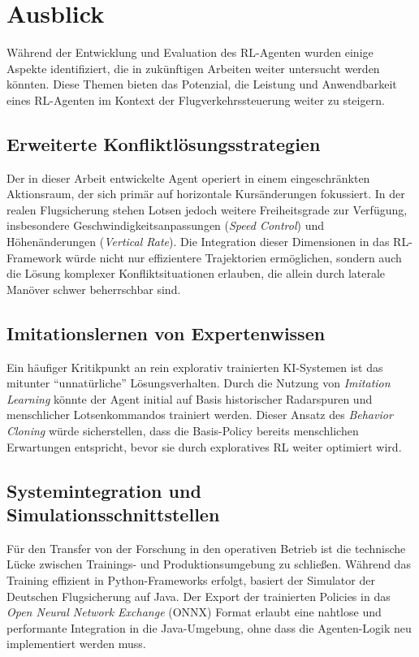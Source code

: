 \section{Ausblick}
\label{ch:Future_Work}
Während der Entwicklung und Evaluation des \ac{RL}\hyp{}Agenten wurden einige Aspekte identifiziert, die in zukünftigen Arbeiten weiter untersucht werden könnten. Diese Themen bieten das Potenzial, die Leistung und Anwendbarkeit eines \ac{RL}\hyp{}Agenten im Kontext der Flugverkehrssteuerung weiter zu steigern.

\subsection*{Erweiterte Konfliktlösungsstrategien}
Der in dieser Arbeit entwickelte Agent operiert in einem eingeschränkten Aktionsraum, der sich primär auf horizontale Kursänderungen fokussiert. In der realen Flugsicherung stehen Lotsen jedoch weitere Freiheitsgrade zur Verfügung, insbesondere Geschwindigkeitsanpassungen (\emph{Speed Control}) und Höhenänderungen (\emph{Vertical Rate}). Die Integration dieser Dimensionen in das \ac{RL}-Framework würde nicht nur effizientere Trajektorien ermöglichen, sondern auch die Lösung komplexer Konfliktsituationen erlauben, die allein durch laterale Manöver schwer beherrschbar sind.

\subsection*{Imitationslernen von Expertenwissen}
Ein häufiger Kritikpunkt an rein explorativ trainierten \ac{KI}-Systemen ist das mitunter \enquote{unnatürliche} Lösungsverhalten. Durch die Nutzung von \emph{Imitation Learning} \cite{imitationLearning} könnte der Agent initial auf Basis historischer Radarspuren und menschlicher Lotsenkommandos trainiert werden. Dieser Ansatz des \emph{Behavior Cloning} würde sicherstellen, dass die Basis-Policy bereits menschlichen Erwartungen entspricht, bevor sie durch exploratives \ac{RL} weiter optimiert wird.

\subsection*{Systemintegration und Simulationsschnittstellen}
Für den Transfer von der Forschung in den operativen Betrieb ist die technische Lücke zwischen Trainings- und Produktionsumgebung zu schließen. Während das Training effizient in Python-Frameworks erfolgt, basiert der Simulator der Deutschen Flugsicherung auf Java. Der Export der trainierten Policies in das \emph{Open Neural Network Exchange} (ONNX) Format erlaubt eine nahtlose und performante Integration in die Java-Umgebung, ohne dass die Agenten-Logik neu implementiert werden muss.
\medskip


